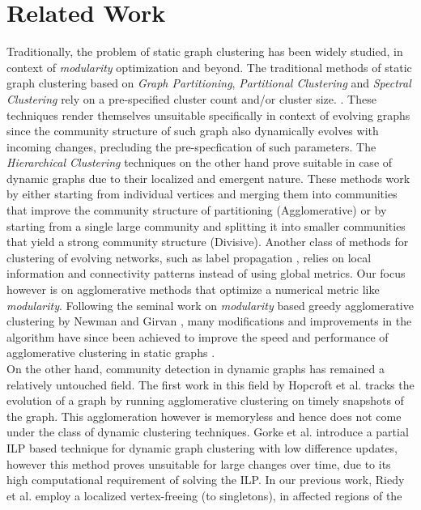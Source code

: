 \documentclass[conference]{IEEEtran}
\begin{document}
\section{Related Work}
Traditionally, the problem of static graph clustering has been widely studied, 
in context of \emph{modularity} optimization and beyond. The traditional methods 
of static graph clustering based on \emph{Graph Partitioning}, 
\emph{Partitional Clustering} and \emph{Spectral Clustering} rely on a 
pre-specified cluster count and/or cluster size. \cite{for}. These techniques 
render themselves unsuitable specifically in context of evolving graphs since 
the community structure of such graph also dynamically evolves with incoming 
changes, precluding the pre-specfication of such parameters. The 
\emph{Hierarchical Clustering} techniques on the other hand prove suitable in 
case of dynamic graphs due to their localized and emergent nature. These 
methods work by either starting from individual vertices and merging them into 
communities that improve the community structure of partitioning (Agglomerative) 
or by starting from a single large community and splitting it into 
smaller communities that yield a strong community structure (Divisive). Another 
class of methods for clustering of evolving networks, such as label propagation 
\cite{har}, relies on local information and connectivity patterns instead of 
using global metrics.  Our focus however is on agglomerative methods that 
optimize a numerical metric like \emph{modularity}. Following the seminal work 
on \emph{modularity} based greedy agglomerative clustering by Newman and Girvan 
\cite{new}, many modifications and improvements in the algorithm have since been 
achieved to improve the speed and performance of agglomerative clustering in 
static graphs \cite{cla, blo, sch, rie2}.\\
On the other hand, community detection in dynamic graphs has remained a 
relatively untouched field. The first work in this field by Hopcroft et al. 
\cite{hop} tracks the evolution of a graph by running agglomerative 
clustering on timely snapshots of the graph. This agglomeration however is 
memoryless and hence does not come under the class of dynamic clustering 
techniques. Gorke et al. \cite{gor2} introduce a partial ILP based technique for 
dynamic graph clustering with low difference updates, however this method proves 
unsuitable for large changes over time, due to its high computational 
requirement of solving the ILP. In our previous work, Riedy et al. \cite{rie} 
employ a localized vertex-freeing (to singletons), in affected regions of the 
\end{document}
